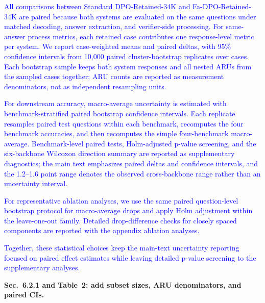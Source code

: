 \documentclass[12pt]{article}
\newcommand{\added}[1]{\textcolor{blue}{#1}}
\begin{document}
\begin{displayquote}
\added{All comparisons between Standard DPO-Retained-34K and Fa-DPO-Retained-34K are paired because both systems are evaluated on the same questions under matched decoding, answer extraction, and verifier-side processing. For same-answer process metrics, each retained case contributes one response-level metric per system. We report case-weighted means and paired deltas, with 95\% confidence intervals from 10,000 paired cluster-bootstrap replicates over cases. Each bootstrap sample keeps both system responses and all nested ARUs from the sampled cases together; ARU counts are reported as measurement denominators, not as independent resampling units.}

\added{For downstream accuracy, macro-average uncertainty is estimated with benchmark-stratified paired bootstrap confidence intervals. Each replicate resamples paired test questions within each benchmark, recomputes the four benchmark accuracies, and then recomputes the simple four-benchmark macro-average. Benchmark-level paired tests, Holm-adjusted p-value screening, and the six-backbone Wilcoxon direction summary are reported as supplementary diagnostics; the main text emphasizes paired deltas and confidence intervals, and the 1.2--1.6 point range denotes the observed cross-backbone range rather than an uncertainty interval.}

\added{For representative ablation analyses, we use the same paired question-level bootstrap protocol for macro-average drops and apply Holm adjustment within the leave-one-out family. Detailed drop-difference checks for closely spaced components are reported with the appendix ablation analyses.}

\added{Together, these statistical choices keep the main-text uncertainty reporting focused on paired effect estimates while leaving detailed p-value screening to the supplementary analyses.}
\end{displayquote}

\textbf{Sec.~6.2.1 and Table~2: add subset sizes, ARU denominators, and paired CIs.}
\end{document}
